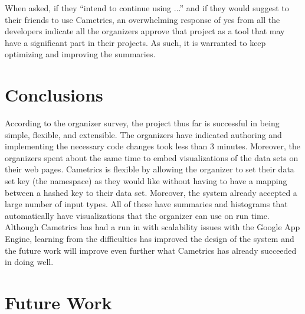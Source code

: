 \documentclass[10pt,a4paper,english]{article}
\begin{document}
When asked, if they ``intend to continue using ...'' and if they would suggest to their friends to use Cametrics, an overwhelming response of yes from all the developers indicate all the organizers approve that project as a tool that may have a significant part in their projects. As such, it is warranted to keep optimizing and improving the summaries.


\pagebreak{}




\hypertarget{conclusions}{}
\section*{Conclusions}
\label{conclusions}

According to the organizer survey, the project thus far is successful in being simple, flexible, and extensible. The organizers have indicated authoring and implementing the necessary code changes took less than 3 minutes. Moreover, the organizers spent about the same time to embed visualizations of the data sets on their web pages. Cametrics is flexible by allowing the organizer to set their data set key (the namespace) as they would like without having to have a mapping between a hashed key to their data set. Moreover, the system already accepted a large number of input types. All of these have summaries and histograms that automatically have visualizations that the organizer can use on run time. Although Cametrics has had a run in with scalability issues with the Google App Engine, learning from the difficulties has improved the design of the system and the future work will improve even further what Cametrics has already succeeded in doing well.


\pagebreak{}




\hypertarget{future-work}{}
\section*{Future Work}
\label{future-work}
\end{document}

